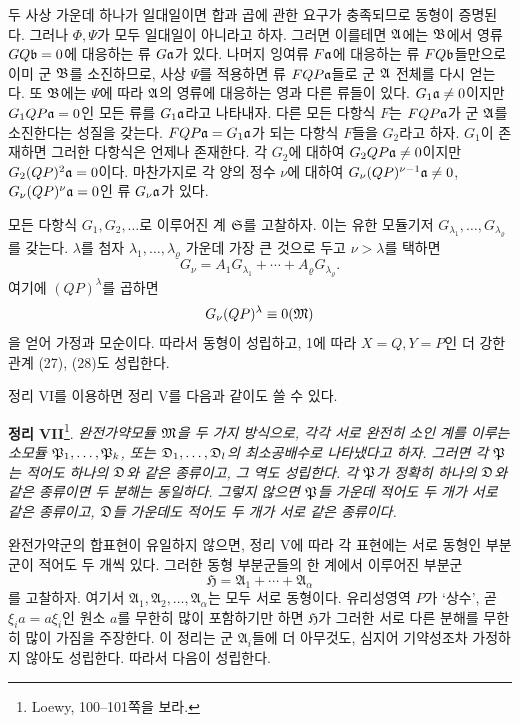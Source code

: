 두 사상 가운데 하나가 일대일이면 합과 곱에 관한 요구가 충족되므로 동형이 증명된다. 그러나 \(\Phi,\Psi\)가 모두 일대일이 아니라고 하자. 그러면 이를테면 \(\mathfrak A\)에는 \(\mathfrak B\)에서 영류 \(GQ\mathfrak{b}=0\)에 대응하는 류 \(G\mathfrak{a}\)가 있다. 나머지 잉여류 \(F\mathfrak{a}\)에 대응하는 류 \(FQ\mathfrak{b}\)들만으로 이미 군 \(\mathfrak B\)를 소진하므로, 사상 \(\Psi\)를 적용하면 류 \(FQP\mathfrak{a}\)들로 군 \(\mathfrak A\) 전체를 다시 얻는다. 또 \(\mathfrak B\)에는 \(\Psi\)에 따라 \(\mathfrak A\)의 영류에 대응하는 영과 다른 류들이 있다. \(G_1\mathfrak{a}\ne0\)이지만 \(G_1QP\mathfrak{a}=0\)인 모든 류를 \(G_1\mathfrak{a}\)라고 나타내자. 다른 모든 다항식 \(F\)는 \(FQP\mathfrak{a}\)가 군 \(\mathfrak A\)를 소진한다는 성질을 갖는다. \(FQP\mathfrak{a}=G_1\mathfrak{a}\)가 되는 다항식 \(F\)들을 \(G_2\)라고 하자. \(G_1\)이 존재하면 그러한 다항식은 언제나 존재한다. 각 \(G_2\)에 대하여 \(G_2QP\mathfrak{a}\ne0\)이지만 \(G_2(QP)^2\mathfrak{a}=0\)이다. 마찬가지로 각 양의 정수 \(\nu\)에 대하여 \(G_\nu(QP)^{\nu-1}\mathfrak{a}\ne0\), \(G_\nu(QP)^\nu\mathfrak{a}=0\)인 류 \(G_\nu\mathfrak{a}\)가 있다.

모든 다항식 \(G_1,G_2,\ldots\)로 이루어진 계 \(\mathfrak S\)를 고찰하자. 이는 유한 모듈기저 \(G_{\lambda_1},\ldots,G_{\lambda_\varrho}\)를 갖는다. \(\lambda\)를 첨자 \(\lambda_1,\ldots,\lambda_\varrho\) 가운데 가장 큰 것으로 두고 \(\nu>\lambda\)를 택하면
\[
 G_\nu=A_1G_{\lambda_1}+\cdots+A_\varrho G_{\lambda_\varrho}.
\]
여기에 \((QP)^\lambda\)를 곱하면
\[
 G_\nu(QP)^\lambda\equiv0(\mathfrak M)
\]
을 얻어 가정과 모순이다. 따라서 동형이 성립하고, 1에 따라 \(X=Q,Y=P\)인 더 강한 관계 (27), (28)도 성립한다.

정리 VI를 이용하면 정리 V를 다음과 같이도 쓸 수 있다.

\textbf{정리 VII}\footnote{Loewy, 100--101쪽을 보라.}. \emph{완전가약모듈 \(\mathfrak M\)을 두 가지 방식으로, 각각 서로 완전히 소인 계를 이루는 소모듈 \(\mathfrak P_1,\ldots,\mathfrak P_k\), 또는 \(\mathfrak D_1,\ldots,\mathfrak D_l\)의 최소공배수로 나타냈다고 하자. 그러면 각 \(\mathfrak P\)는 적어도 하나의 \(\mathfrak D\)와 같은 종류이고, 그 역도 성립한다. 각 \(\mathfrak P\)가 정확히 하나의 \(\mathfrak D\)와 같은 종류이면 두 분해는 동일하다. 그렇지 않으면 \(\mathfrak P\)들 가운데 적어도 두 개가 서로 같은 종류이고, \(\mathfrak D\)들 가운데도 적어도 두 개가 서로 같은 종류이다.}


완전가약군의 합표현이 유일하지 않으면, 정리 V에 따라 각 표현에는 서로 동형인 부분군이 적어도 두 개씩 있다. 그러한 동형 부분군들의 한 계에서 이루어진 부분군
\[
 \mathfrak H=\mathfrak A_1+\cdots+\mathfrak A_\alpha
\]
를 고찰하자. 여기서 \(\mathfrak A_1,\mathfrak A_2,\ldots,\mathfrak A_\alpha\)는 모두 서로 동형이다. 유리성영역 \(P\)가 ‘상수’, 곧 \(\xi_i a=a\xi_i\)인 원소 \(a\)를 무한히 많이 포함하기만 하면 \(\mathfrak H\)가 그러한 서로 다른 분해를 무한히 많이 가짐을 주장한다. 이 정리는 군 \(\mathfrak A_i\)들에 더 아무것도, 심지어 기약성조차 가정하지 않아도 성립한다. 따라서 다음이 성립한다.

